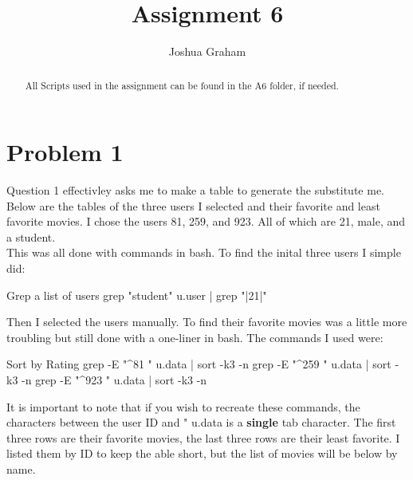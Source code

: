 \documentclass[11pt]{report}
\begin{document}
\title{Assignment 6}
\author{Joshua Graham}

\maketitle
\pagebreak
\begin{abstract}
All Scripts used in the assignment can be found in the A6 folder, if needed.

\end{abstract}
\section{Problem 1}
	Question 1 effectivley asks me to make a table to generate the substitute me. Below are the tables of the three users I selected and their favorite and least favorite movies. I chose the users 81, 259, and 923. All of which are 21, male, and a student. 
\\
This was all done with commands in bash. To find the inital three users I simple did:
\begin{mylisting}{Grep a list of users}
grep "student" u.user | grep "|21|"
\end{mylisting}
Then I selected the users manually. To find their favorite movies was a little more troubling but still done with a one-liner in bash. The commands I used were:
\begin{mylisting}{Sort by Rating}
grep -E "^81	" u.data | sort -k3 -n
grep -E "^259	" u.data | sort -k3 -n
grep -E "^923	" u.data | sort -k3 -n

\end{mylisting}
It is important to note that if you wish to recreate these commands, the characters between the user ID and " u.data is a \textbf{single} tab character.
The first three rows are their favorite movies, the last three rows are their least favorite. I listed them by ID to keep the able short, but the list of movies will be below by name.
\end{document}
